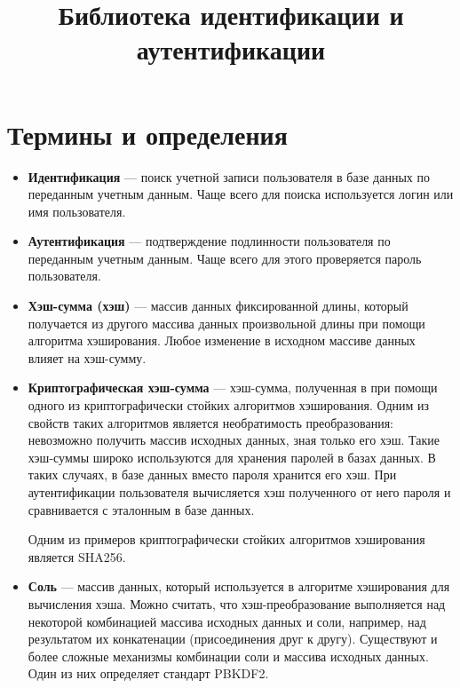 \documentclass[14pt]{extarticle}
\title{Библиотека идентификации и аутентификации}
\begin{document}
\maketitle

\tableofcontents

\section{Термины и определения}

\begin{itemize}

 \item \textbf{Идентификация} --- поиск учетной записи пользователя в базе
  данных по переданным учетным данным. 
  Чаще всего для поиска используется логин или имя пользователя.

 \item \textbf{Аутентификация} --- подтверждение подлинности пользователя
  по переданным учетным данным.
  Чаще всего для этого проверяется пароль пользователя.

 \item \textbf{Хэш-сумма (хэш)} --- массив данных фиксированной длины, который
  получается из другого массива данных произвольной длины при помощи алгоритма
  хэширования.
  Любое изменение в исходном массиве данных влияет на хэш-сумму.

 \item \textbf{Криптографическая хэш-сумма} --- хэш-сумма, полученная в
  при помощи одного из криптографически стойких алгоритмов хэширования.
  Одним из свойств таких алгоритмов является необратимость преобразования:
  невозможно получить массив исходных данных, зная только его хэш.
  Такие хэш-суммы широко используются для хранения паролей в базах данных.
  В таких случаях, в базе данных вместо пароля хранится его хэш.
  При аутентификации пользователя вычисляется хэш полученного от него пароля
  и сравнивается с эталонным в базе данных.

  Одним из примеров криптографически стойких алгоритмов хэширования является
  SHA256\footnotemark{}.


 \item \textbf{Соль} --- массив данных, который используется в
  алгоритме хэширования для вычисления хэша.
  Можно считать, что хэш-преобразование выполняется над некоторой комбинацией
  массива исходных данных и соли, например, над результатом их конкатенации
  (присоединения друг к другу).
  Существуют и более сложные механизмы комбинации соли и массива исходных
  данных.
  Один из них определяет стандарт PBKDF2\footnotemark{}.


\end{itemize}
\end{document}
